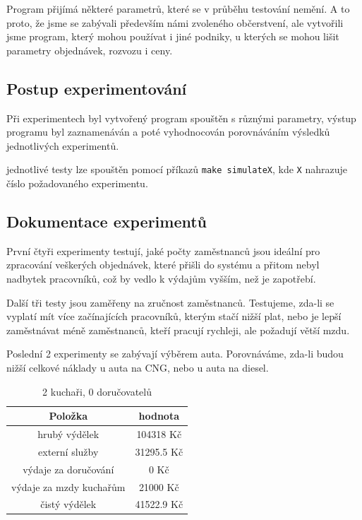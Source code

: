 \documentclass[a4paper, 11pt]{article}
\begin{document}
Program přijímá některé parametrů, které se v průběhu testování nemění. A to proto, že jsme se zabývali především námi zvoleného občerstvení, ale vytvořili jsme program, který mohou používat i jiné podniky, u kterých se mohou lišit parametry objednávek, rozvozu i ceny.

\subsection{Postup experimentování}
Při experimentech byl vytvořený program spouštěn s různými parametry, výstup programu byl zaznamenáván a poté vyhodnocován porovnáváním výsledků jednotlivých experimentů.


jednotlivé testy lze spouštěn pomocí příkazů \texttt{make simulateX}, kde \texttt{X} nahrazuje číslo požadovaného experimentu.

\subsection{Dokumentace experimentů}
První čtyři experimenty testují, jaké počty zaměstnanců jsou ideální pro zpracování veškerých objednávek, které přišli do systému a přitom nebyl nadbytek pracovníků, což by vedlo k výdajům vyšším, než je zapotřebí.

Další tři testy jsou zaměřeny na zručnost zaměstnanců. Testujeme, zda-li se vyplatí mít více začínajících pracovníků, kterým stačí nižší plat, nebo je lepší zaměstnávat méně zaměstnanců, kteří pracují rychleji, ale požadují větší mzdu.

Poslední 2 experimenty se zabývají výběrem auta. Porovnáváme, zda-li budou nižší celkové náklady u auta na CNG, nebo u auta na diesel. 

\begin{table}[h]
\centering
\begin{tabular}{cc}
\textbf{Položka} & \textbf{hodnota}                                                                                   \\ \hline
hrubý výdělek & 104318 Kč \\ \hline
externí služby  & 31295.5 Kč \\ \hline                      
výdaje za doručování &  0 Kč \\ \hline
výdaje za mzdy kuchařům &  21000 Kč \\ \hline
čistý výdělek &  41522.9 Kč
\end{tabular}
\caption{2 kuchaři, 0 doručovatelů}
\end{table}
\end{document}
